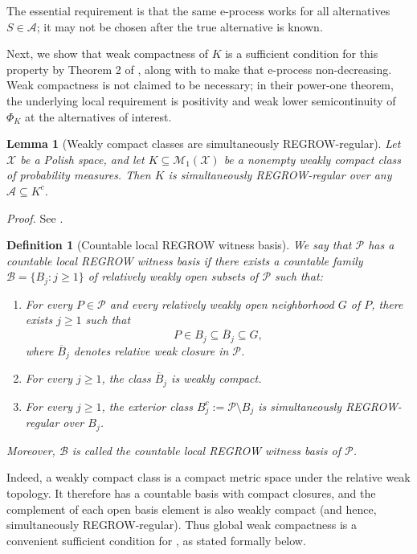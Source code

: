 \documentclass[12pt]{article}
\theoremstyle{spaced}
\newtheorem{lemma}[lemma]{Lemma}
\newtheorem{definition}[definition]{Definition}
\theoremstyle{remark}
\newcommand{\calP}{\mathcal P}
\begin{document}
The essential requirement is that the same e-process works for all
alternatives $S\in\mathcal A$; it may not be chosen after the true
alternative is known.

Next, we show that weak compactness of $K$ is a sufficient condition for this property by Theorem 2 of \cite{ram2026power}, along with  to make that e-process non-decreasing.  Weak compactness is not claimed to be necessary; in their power-one theorem, the underlying local requirement is positivity and weak lower semicontinuity of $\Phi_K$ at the alternatives of interest.


\begin{lemma}[Weakly compact classes are simultaneously REGROW-regular]
\label{lem:weakly-compact-regrow}
Let $\mathcal X$ be a Polish space, and let
$ K\subseteq\mathcal M_1(\mathcal X)$
be a nonempty weakly compact class of probability measures.
Then $K$ is {simultaneously REGROW-regular over any
$\mathcal A \subseteq K^c$}. 
\end{lemma}


\emph{Proof.} See .


\begin{definition}[Countable local REGROW witness basis]\label{def:witness-basis}
We say that $\calP$ has a countable local REGROW witness basis if there exists a countable family $\mathscr B=\{B_j:j\ge 1\}$ of relatively weakly open subsets of $\calP$ such that:
\begin{enumerate}[label=\textup{(\roman*)}]
\item
For every $P\in\calP$ and every relatively weakly open
neighborhood $G$ of $P$, there exists $j\ge1$ such that
\[
    P\in B_j
    \subseteq
    \overline B_j
    \subseteq
    G,
\]
where $\overline B_j$ denotes relative weak closure in $\calP$.

\item
For every $j\ge1$, the class $\overline B_j$ is weakly compact. 
\item
For every $j\ge1$, the exterior class
$B_j^c:=\calP\setminus B_j$
is simultaneously REGROW-regular over $B_j$. 
\end{enumerate}
Moreover, $\mathscr B$ is called the countable local REGROW witness basis of $\calP$.
\end{definition}

Indeed, a weakly compact class is a compact metric space under the
relative weak topology. It therefore has a countable basis with
compact closures, and the complement of each open basis element is
also weakly compact (and hence, simultaneously REGROW-regular). Thus global weak compactness is a convenient
sufficient condition for , as stated formally below.
\end{document}
